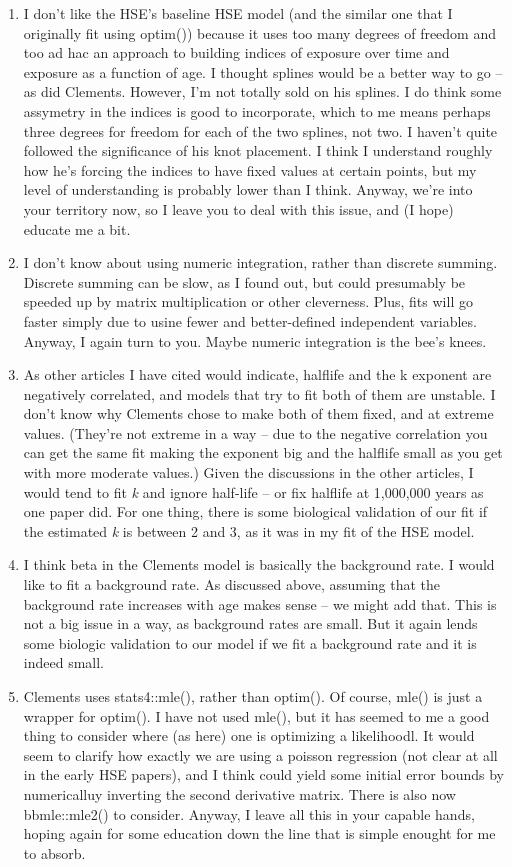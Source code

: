 \documentclass{article}\usepackage{graphicx, color}
\begin{document}
\begin{enumerate}
  \item I don't like the HSE's baseline HSE model (and the similar one that I originally fit using optim()) because it uses too many degrees of freedom and too ad hac an approach to building indices of exposure over time and exposure as a function of age.  I thought splines would be a better way to go -- as did Clements.  However, I'm not totally sold on his splines.  I do think some assymetry in the indices is good to incorporate, which to me means perhaps three degrees for freedom for each of the two splines, not two.  I haven't quite followed the significance of his knot placement.  I think I understand roughly how he's forcing the indices to have fixed values at certain points, but my level of understanding is probably lower than I think.  Anyway, we're into your territory now, so I leave you to deal with this issue, and (I hope) educate me a bit.
  \item I don't know about using numeric integration, rather than discrete summing.  Discrete summing can be slow, as I found out, but could presumably be speeded up by matrix multiplication or other cleverness.  Plus, fits will go faster simply due to usine fewer and better-defined independent variables.  Anyway, I again turn to you.  Maybe numeric integration is the bee's knees.
  \item As other articles I have cited would indicate, halflife and the k exponent are negatively correlated, and models that try to fit both of them are unstable.  I don't know why Clements chose to make both of them fixed, and at extreme values.  (They're not extreme in a way -- due to the negative correlation you can get the same fit making the exponent big and the halflife small as you get with more moderate values.)  Given the discussions in the other articles, I would tend to fit \emph{k} and ignore half-life -- or fix halflife at 1,000,000 years as one paper did.  For one thing, there is some biological validation of our fit if the estimated \emph{k} is between 2 and 3, as it was in my fit of the HSE model.
  \item I think beta in the Clements model is basically the background rate.  I would like to fit a background rate.  As discussed above, assuming that the background rate increases with age makes sense -- we might add that.  This is not a big issue in a way, as background rates are small.  But it again lends some biologic validation to our model if we fit a background rate and it is indeed small.
  \item Clements uses stats4::mle(), rather than optim().  Of course, mle() is just a wrapper for optim().  I have not used mle(), but it has seemed to me a good thing to consider where (as here) one is optimizing a likelihoodl.  It would seem to clarify how exactly we are using a poisson regression (not clear at all in the early HSE papers), and I think could yield some initial error bounds by numericalluy inverting the second derivative matrix. There is also now bbmle::mle2() to consider.  Anyway, I leave all this in your capable hands, hoping again for some education down the line that is simple enought for me to absorb.

\end{enumerate}
\end{document}
